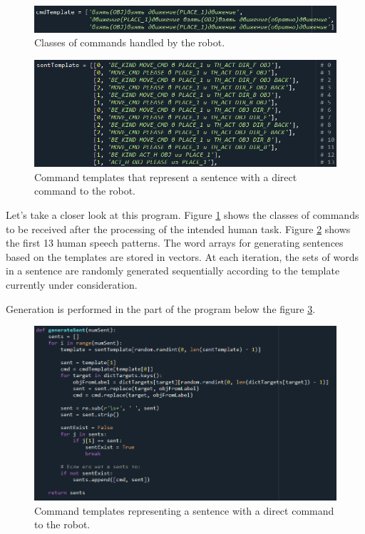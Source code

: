 \documentclass{article}
\begin{document}
\begin{figure}[!tbh]
    \centering
    \includegraphics[width=1\linewidth]{cmdTemplate.jpg}
    \caption{Classes of commands handled by the robot.}
    \label{fig:cmdTemplate}
\end{figure}
\begin{figure}[!tbh]
    \centering
    \includegraphics[width=0.9\linewidth]{sentTemplate.png}
    \caption{Command templates that represent a sentence with a direct command to the robot.}
    \label{fig:sentTemplate}
\end{figure}
Let's take a closer look at this program. Figure \ref{fig:cmdTemplate} shows the classes of commands to be received after the processing of the intended human task. Figure \ref{fig:sentTemplate} shows the first 13 human speech patterns.
The word arrays for generating sentences based on the templates are stored in vectors. At each iteration, the sets of words in a sentence are randomly generated sequentially according to the template currently under consideration.

Generation is performed in the part of the program below the figure \ref{fig:main_part}.
\begin{figure}[!tbh]
    \centering
    \includegraphics[width=0.9\linewidth]{main_part.png}
    \caption{Command templates representing a sentence with a direct command to the robot.}
    \label{fig:main_part}
\end{figure}
\end{document}
